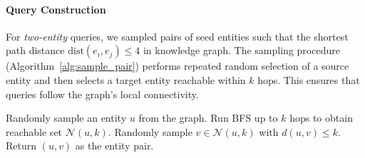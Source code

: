 \begin{table}[ht]
\centering
\caption{Statistics of knowledge graph datasets.}

\label{tab:datasets}
\end{table}


\paragraph{Query Construction} 
For \textit{two-entity} queries, we sampled pairs of seed entities 
such that the shortest path distance $\mathrm{dist}(e_i, e_j) \leq 4$ in knowledge graph. 
The sampling procedure (Algorithm~\ref{alg:sample_pair}) performs repeated random selection of a source entity 
and then selects a target entity reachable within $k$ hops. 
This ensures that queries follow the graph’s local connectivity.

\begin{algorithm}[ht]
\caption{Entity Pair Sampling}
\label{alg:sample_pair}
\begin{algorithmic}[1]
\STATE Randomly sample an entity $u$ from the graph.
\STATE Run BFS up to $k$ hops to obtain reachable set $\mathcal{N}(u,k)$.
\STATE Randomly sample $v \in \mathcal{N}(u,k)$ with $d(u,v)\leq k$.
\STATE Return $(u,v)$ as the entity pair.
\end{algorithmic}
\end{algorithm}


